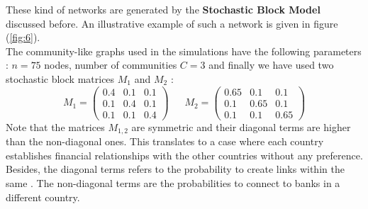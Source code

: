 \documentclass[14pt]{article}
\providecommand{\reff}[1]{(\ref{#1})}
\begin{document}
These kind of networks are generated by the \textbf{Stochastic Block Model} discussed before. An illustrative example of such a network is given in figure \reff{fig:6}.
\\The community-like graphs used in the simulations have the following parameters : $n=75$ nodes, number of communities $C = 3$ and finally we have used two stochastic block matrices $M_1$ and $M_2$ :
\[ M_1 =\left( \begin{array}{ccc}
0.4 & 0.1 & 0.1 \\
0.1 & 0.4 & 0.1 \\
0.1 & 0.1 & 0.4
\end{array} \right)\>
\> \;\; \; \; M_2 = \left( \begin{array}{ccc}
0.65 & 0.1 & 0.1 \\
0.1 & 0.65 & 0.1 \\
0.1 & 0.1 & 0.65
\end{array} \right)
\]
Note that the matrices $M_{1,2}$ are symmetric and their diagonal terms are higher than the non-diagonal ones. This translates to a case where each country establishes financial relationships with the other countries without any preference. Besides, the diagonal terms refers to the probability to create links within the same . The non-diagonal terms are the probabilities to connect to banks in a different country.
\end{document}
